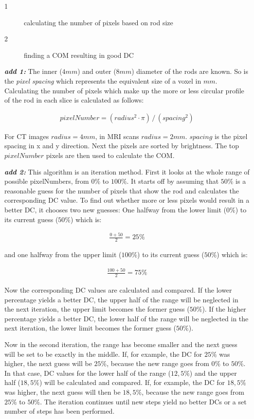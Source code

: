 \begin{description}
 \item[1] calculating the number of pixels based on rod size
 \item[2] finding a COM resulting in good DC
\end{description}

\textit{\textbf{add 1:}}
The inner ($4mm$) and outer ($8mm$) diameter of the rods are known. So is the \textit{pixel spacing} which represents the equivalent size of a voxel in $mm$.
Calculating the number of pixels which make up the more or less circular profile of the rod in each slice is calculated as follows:

\begin{align}
 pixelNumber = (radius^2 \cdot \pi) \, / \, (spacing^2)
\end{align}

For CT images $radius = 4mm$, in MRI scans $radius = 2mm$. $spacing$ is the pixel spacing in x and y direction.
Next the pixels are sorted by brightness. The top $pixelNumber$ pixels are then used to calculate the COM.

\textit{\textbf{add 2:}}
This algorithm is an iteration method.
First it looks at the whole range of possible pixelNumbers, from $0\%$ to $100\%$.
It starts off by assuming that $50\%$ is a reasonable guess for the number of pixels that show the rod and calculates the corresponding DC value.
To find out whether more or less pixels would result in a better DC, it chooses two new guesses:
One halfway from the lower limit ($0\%$) to its current guess ($50\%$) which is:

\begin{align}
 \frac{0+50}{2}=25\% 
\end{align}

and one halfway from the upper limit ($100\%$) to its current guess ($50\%$) which is:
 
\begin{align}
 \frac{100+50}{2}=75\%
\end{align}
 
Now the corresponding DC values are calculated and compared.
If the lower percentage yields a better DC, the upper half of the range will be neglected in the next iteration, the upper limit becomes the former guess ($50\%$).
If the higher percentage yields a better DC, the lower half of the range will be neglected in the next iteration, the lower limit becomes the former guess ($50\%$).

Now in the second iteration, the range has become smaller and the next guess will be set to be exactly in the middle.
If, for example, the DC for $25\%$ was higher, the next guess will be $25\%$, because the new range goes from $0\%$ to $50\%$.
In that case, DC values for the lower half of the range ($12,5\%$) and the upper half ($18,5\%$) will be calculated and compared.
If, for example, the DC for $18,5\%$ was higher, the next guess will then be $18,5\%$, because the new range goes from $25\%$ to $50\%$.
The iteration continues until new steps yield no better DCs or a set number of steps has been performed.

